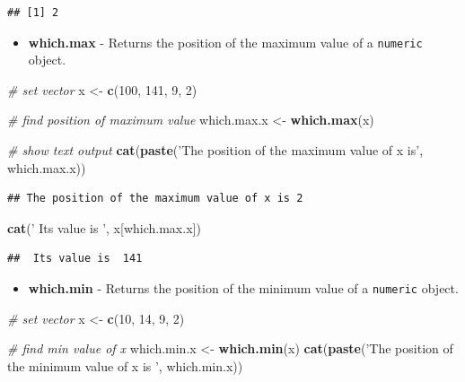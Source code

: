 \documentclass[11pt,]{book}
\newenvironment{Shaded}{\begin{snugshade}}{\end{snugshade}}
\newcommand{\KeywordTok}[1]{\textcolor[rgb]{0.27,0.27,0.27}{\textbf{#1}}}
\newcommand{\DecValTok}[1]{\textcolor[rgb]{0.06,0.06,0.06}{#1}}
\newcommand{\StringTok}[1]{\textcolor[rgb]{0.5,0.5,0.5}{#1}}
\newcommand{\CommentTok}[1]{\textcolor[rgb]{0.56,0.35,0.01}{\textit{#1}}}
\newcommand{\NormalTok}[1]{#1}
\providecommand{\tightlist}{%
  \setlength{\itemsep}{0pt}\setlength{\parskip}{0pt}}
\begin{document}
\begin{verbatim}
## [1] 2
\end{verbatim}

\begin{itemize}
\tightlist
\item
  \textbf{which.max} - Returns the position of the maximum value of a
  \texttt{numeric} object. 
\end{itemize}

\begin{Shaded}
\begin{Highlighting}[]
\CommentTok{# set vector}
\NormalTok{x <-}\StringTok{ }\KeywordTok{c}\NormalTok{(}\DecValTok{100}\NormalTok{, }\DecValTok{141}\NormalTok{, }\DecValTok{9}\NormalTok{, }\DecValTok{2}\NormalTok{)}

\CommentTok{# find position of maximum value}
\NormalTok{which.max.x <-}\StringTok{ }\KeywordTok{which.max}\NormalTok{(x)}

\CommentTok{# show text output}
\KeywordTok{cat}\NormalTok{(}\KeywordTok{paste}\NormalTok{(}\StringTok{'The position of the maximum value of x is'}\NormalTok{,}
\NormalTok{          which.max.x))}
\end{Highlighting}
\end{Shaded}

\begin{verbatim}
## The position of the maximum value of x is 2
\end{verbatim}

\begin{Shaded}
\begin{Highlighting}[]
\KeywordTok{cat}\NormalTok{(}\StringTok{' Its value is '}\NormalTok{, x[which.max.x])}
\end{Highlighting}
\end{Shaded}

\begin{verbatim}
##  Its value is  141
\end{verbatim}

\begin{itemize}
\tightlist
\item
  \textbf{which.min} - Returns the position of the minimum value of a
  \texttt{numeric} object. 
\end{itemize}

\begin{Shaded}
\begin{Highlighting}[]
\CommentTok{# set vector}
\NormalTok{x <-}\StringTok{ }\KeywordTok{c}\NormalTok{(}\DecValTok{10}\NormalTok{, }\DecValTok{14}\NormalTok{, }\DecValTok{9}\NormalTok{, }\DecValTok{2}\NormalTok{)}

\CommentTok{# find min value of x}
\NormalTok{which.min.x <-}\StringTok{ }\KeywordTok{which.min}\NormalTok{(x)}
\KeywordTok{cat}\NormalTok{(}\KeywordTok{paste}\NormalTok{(}\StringTok{'The position of the minimum value of x is '}\NormalTok{, }
\NormalTok{          which.min.x))}
\end{Highlighting}
\end{Shaded}
\end{document}
